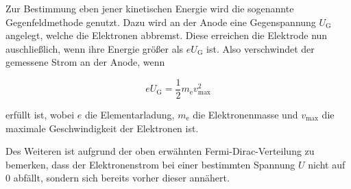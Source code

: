 Zur Bestimmung eben jener kinetischen Energie wird die sogenannte Gegenfeldmethode genutzt.
Dazu wird an der Anode eine Gegenspannung $U_\text{G}$ angelegt, welche die Elektronen abbremst.
Diese erreichen die Elektrode nun auschließlich, wenn ihre Energie größer als $e U_\text{G}$ ist.
Also verschwindet der gemessene Strom an der Anode, wenn

\begin{equation}
    \label{eqn:gegenfeld}
    e U_\text{G} = \frac{1}{2} m_\text{e} v_\text{max}^2
\end{equation}

erfüllt ist, wobei $e$ die Elementarladung, $m_\text{e}$ die Elektronenmasse und $v_\text{max}$ die maximale Geschwindigkeit der Elektronen ist.

Des Weiteren ist aufgrund der oben erwähnten Fermi-Dirac-Verteilung zu bemerken, dass der Elektronenstrom bei einer bestimmten Spannung $U$ nicht auf 0 abfällt,
sondern sich bereits vorher dieser annähert.
